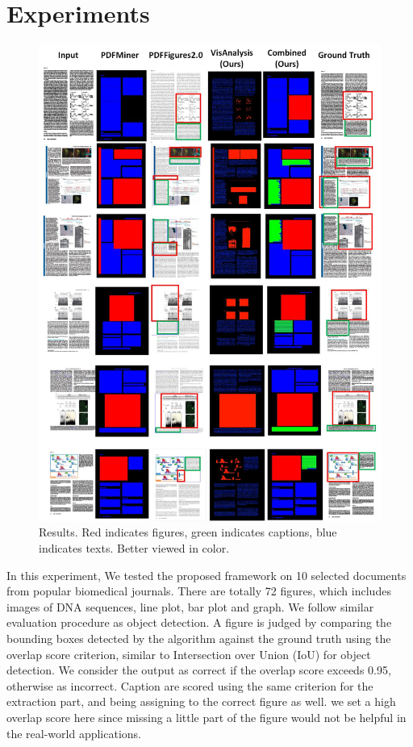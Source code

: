 \documentclass{article}
\begin{document}
\section{Experiments}
\begin{figure}[t] %
\centering
\includegraphics[width=160mm]{Results_part.jpg} 
\caption{
Results. Red indicates figures, green indicates captions, blue indicates texts. Better viewed in color.}
\label{fig:results}
\end{figure}

In this experiment, We tested the proposed framework on 10 selected documents from popular biomedical journals. There are totally 72 figures, which includes images of DNA sequences, line plot, bar plot and graph. 
We follow similar evaluation procedure as object detection. 
A figure is judged by comparing the bounding boxes detected by the algorithm against the ground truth using the overlap score criterion, similar to Intersection over Union (IoU) for object detection. We consider the output as correct if the overlap score exceeds 0.95, otherwise as incorrect. Caption are scored using the same criterion for the extraction part, and being assigning to the correct figure as well. 
we set a high overlap score here since missing a little part of the figure would not be helpful in the real-world applications. 
\end{document}
